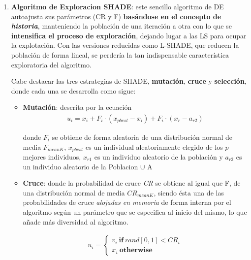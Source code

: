 \begin{enumerate}
	\item  \label{algSHADEILS:1} \textbf{Algoritmo de Exploracion SHADE}: este sencillo algoritmo de DE autoajusta sus parámetros (CR y F) \textbf{basándose en el concepto de \textit{historia}}\cite{SHADE}, manteniendo la población de una iteración a otra con lo que se \textbf{intensifica el proceso de exploración}, dejando lugar a las LS para ocupar la explotación. Con las versiones reducidas como L-SHADE, que reducen la población de forma lineal, se perdería la tan indispensable característica exploratoria del algoritmo.
	
	Cabe destacar las tres estrategias de SHADE, \textbf{mutación}, \textbf{cruce} y \textbf{selección}, donde cada una se desarrolla como sigue:
	\begin{itemize}
		\item \textbf{Mutación}: descrita por la ecuación
		\begin{equation}\label{eq:MutationSH}
			\begin{gathered}
				u_i = x_i + F_i \cdot (x_{pbest} - x_i) + F_i \cdot (x_r - a_{r2})
			\end{gathered}
		\end{equation}
		 
		 donde $F_i$ se obtiene de forma aleatoria de una distribución normal de media $F_{meanK}$, $x_{pbest}$ es un individual aleatoriamente elegido de los $p$ mejores individuos, $x_{r1}$ es un individuo aleatorio de la población y $a_{r2}$ es un individuo aleatorio de la Poblacion $\cup$ A
			
		\item \textbf{Cruce}: donde la probabilidad de cruce \textit{CR} se obtiene al igual que F, de una distribución normal de media $CR_{meanK}$, siendo ésta una de las probabilidades de cruce \textit{alojadas en memoria} de forma interna por el algoritmo según un parámetro que se especifica al inicio del mismo, lo que añade más diversidad al algoritmo.
		
		\begin{equation}\label{eq:CrossoverSH}
			\begin{gathered}
				u_i= \begin{cases}
					v_i \ \textbf{if} \ rand[0,1] < CR_i \\
					x_i \ \textbf{otherwise}
				\end{cases}
			\end{gathered}
		\end{equation}
		

\end{itemize}
\end{enumerate}
